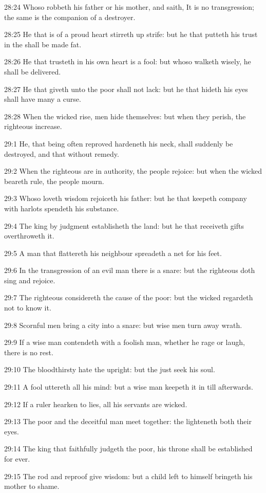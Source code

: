 28:24 Whoso robbeth his father or his mother, and saith, It is no
transgression; the same is the companion of a destroyer.

28:25 He that is of a proud heart stirreth up strife: but he that
putteth his trust in the \LORD shall be made fat.

28:26 He that trusteth in his own heart is a fool: but whoso walketh
wisely, he shall be delivered.

28:27 He that giveth unto the poor shall not lack: but he that hideth
his eyes shall have many a curse.

28:28 When the wicked rise, men hide themselves: but when they perish,
the righteous increase.

29:1 He, that being often reproved hardeneth his neck, shall suddenly
be destroyed, and that without remedy.

29:2 When the righteous are in authority, the people rejoice: but when
the wicked beareth rule, the people mourn.

29:3 Whoso loveth wisdom rejoiceth his father: but he that keepeth
company with harlots spendeth his substance.

29:4 The king by judgment establisheth the land: but he that receiveth
gifts overthroweth it.

29:5 A man that flattereth his neighbour spreadeth a net for his feet.

29:6 In the transgression of an evil man there is a snare: but the
righteous doth sing and rejoice.

29:7 The righteous considereth the cause of the poor: but the wicked
regardeth not to know it.

29:8 Scornful men bring a city into a snare: but wise men turn away
wrath.

29:9 If a wise man contendeth with a foolish man, whether he rage or
laugh, there is no rest.

29:10 The bloodthirsty hate the upright: but the just seek his soul.

29:11 A fool uttereth all his mind: but a wise man keepeth it in till
afterwards.

29:12 If a ruler hearken to lies, all his servants are wicked.

29:13 The poor and the deceitful man meet together: the \LORD
lighteneth both their eyes.

29:14 The king that faithfully judgeth the poor, his throne shall be
established for ever.

29:15 The rod and reproof give wisdom: but a child left to himself
bringeth his mother to shame.

